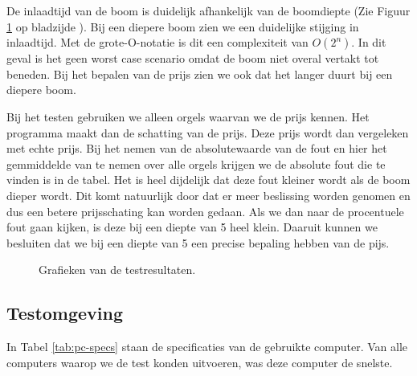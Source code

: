 \newpage

De inlaadtijd van de boom is duidelijk afhankelijk van de boomdiepte (Zie Figuur \ref{fig:test_results} op bladzijde \pageref{fig:test_results}). Bij een diepere boom zien we een duidelijke stijging in inlaadtijd. Met de grote-O-notatie is dit een complexiteit van $ O({2^n}) $. In dit geval is het geen worst case scenario omdat de boom niet overal vertakt tot beneden. Bij het bepalen van de prijs zien we ook dat het langer duurt bij een diepere boom.

Bij het testen gebruiken we alleen orgels waarvan we de prijs kennen. Het programma maakt dan de schatting van de prijs. Deze prijs wordt dan vergeleken met echte prijs. Bij het nemen van de absolutewaarde van de fout en hier het gemmiddelde van te nemen over alle orgels krijgen we de absolute fout die te vinden is in de tabel. Het is heel dijdelijk dat deze fout kleiner wordt als de boom dieper wordt. Dit komt natuurlijk door dat er meer beslissing worden genomen en dus een betere prijsschating kan worden gedaan. Als we dan naar de procentuele fout gaan kijken, is deze bij een diepte van 5 heel klein. Daaruit kunnen we besluiten dat we bij een diepte van 5 een precise bepaling hebben van de pijs.

\begin{figure}[ht]
    \centering


    \caption{Grafieken van de testresultaten.}
    \label{fig:test_results}
\end{figure}

\subsection{Testomgeving}
In Tabel \ref{tab:pc-specs} staan de specificaties van de gebruikte computer. Van alle computers waarop we de test konden uitvoeren, was deze computer de snelste.

